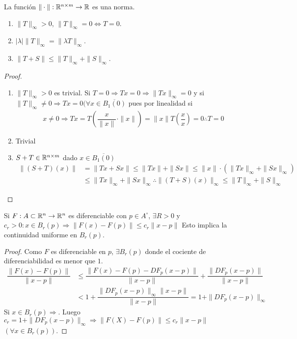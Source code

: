 \begin{lemma}
  La función \(\| \cdot \|: \mathbb{R}^{n \times m} \to \mathbb{R}\) es una norma.
  \begin{enumerate}
    \item \(\|T\|_{\infty} > 0\), \(\|T\|_{\infty} = 0 \iff T = 0\).
    \item \(|\lambda| \|T\|_{\infty} = \|\lambda T\|_{\infty}\).
    \item \(\| T + S\| \leq \|T\|_{\infty} + \|S\|_{\infty}\).
  \end{enumerate}
  \begin{proof}
    \begin{enumerate}
      \item \(\|T\|_{\infty} > 0\) es trivial. Si \(T = 0 \Rightarrow Tx = 0 \Rightarrow \|Tx\|_{\infty} = 0\) y si \(\|T\|_{\infty} \neq 0 \Rightarrow Tx=0 (\forall x \in \overline{B_1(0)}\) pues por linealidad si
            \begin{align*}
              x \neq 0 \Rightarrow Tx = T(\dfrac{x}{\|x\|} \cdot \|x\|) = \|x\| T(\dfrac{x}{x}) = 0 \therefore T = 0
            \end{align*}
      \item Trivial
      \item \(S + T \in \mathbb{R}^{n \times m}\) dado \(x \in \overline{B_1(0)}\) \begin{align*}
              \|(S+T)(x)\| & = \| Tx + Sx \| \leq \|Tx\| + \|Sx\| \leq  \|x\| \cdot (\|Tx\|_{\infty} + \|Sx\|_{\infty})                   \\
                           & \leq \|Tx\|_{\infty} + \|Sx\|_{\infty} \therefore \|(T+S)(x)\|_{\infty} \leq \|T\|_{\infty} + \|S\|_{\infty}
            \end{align*}
    \end{enumerate}
  \end{proof}
\end{lemma}

\begin{lemma}
  Si \(F: A \subset \mathbb{R}^n \to \mathbb{R}^n\) es diferenciable con \(p \in A^{\circ}\), \(\exists R > 0\) y \(c_r > 0 : x \in B_r(p) \Rightarrow \| F(x) - F(p) \| \leq c_r \| x - p\|\)
  Esto implica la continuidad uniforme en \(B_r(p)\).
  \begin{proof}
    Como \(F\) es diferenciable en \(p\), \(\exists B_r(p)\) donde el cociente de diferenciabilidad es menor que \(1\). \begin{align*}
      \dfrac{\|F(x) - F(p)\|}{\|x - p \|} & \leq \dfrac{\|F(x) - F(p) - DF_p(x-p) \|}{\|x-p\|} + \dfrac{\| DF_p(x-p) \|}{\|x-p\|} \\
                                          & < 1 + \dfrac{\|DF_p(x-p)\|_{\infty} \|x-p\|}{\|x-p\|} = 1 + \|DF_p(x-p)\|_{\infty}
    \end{align*}
    Si \(x \in B_r(p) \Rightarrow\). Luego \(c_r = 1 + \|DF_p(x-p)\|_{\infty} \Rightarrow \|F(X) - F(p)\| \leq c_r \|x-p\|\) \((\forall x \in B_r(p))\).
  \end{proof}
\end{lemma}
